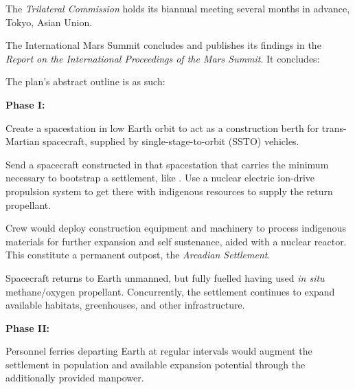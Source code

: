 The {\it Trilateral Commission} holds its biannual meeting several months in advance, Tokyo, Asian Union.
\StopTimelineDate

The International Mars Summit concludes and publishes its findings in the {\it Report on the International Proceedings of the Mars Summit}. It concludes:


The plan's abstract outline is as such:

{\bf Phase I:} 

\startitemize[n]
\item Create a spacestation in low Earth orbit to act as a construction berth for trans-Martian spacecraft, supplied by single-stage-to-orbit (SSTO) vehicles.

\item Send a spacecraft constructed in that spacestation that carries the minimum necessary to bootstrap a settlement, like . Use a nuclear electric ion-drive propulsion system to get there with indigenous resources to supply the return propellant.

\item Crew would deploy construction equipment and machinery to process indigenous materials for further expansion and self sustenance, aided with a nuclear reactor. This constitute a permanent outpost, the {\it Arcadian Settlement}.

\item Spacecraft returns to Earth unmanned, but fully fuelled having used {\it in situ} methane/oxygen propellant. Concurrently, the settlement continues to expand available habitats, greenhouses, and other infrastructure.
\stopitemize

{\bf Phase II:}

\startitemize[n]
\item Personnel ferries departing Earth at regular intervals would augment the settlement in population and available expansion potential through the additionally provided manpower.
\stopitemize

